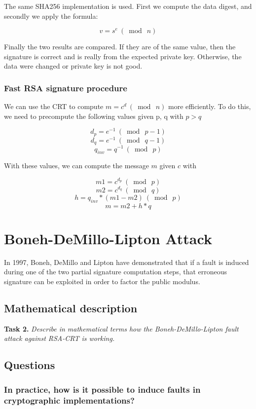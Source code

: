 \documentclass[a4paper]{report}
\begin{document}
The same SHA256 implementation is used. First we compute the data digest, and secondly we apply the formula:

\[
v = s^e  \ (\bmod{\ n} )
\]

Finally the two results are compared. If they are of the same value, then the signature is correct and is really from the expected private key. Otherwise, the data were changed or private key is not good.


\newpage
\subsection{Fast RSA signature procedure}
We can use the CRT to compute $m = c^d\ (\bmod{\ n})$ more efficiently. To do this, we need to precompute the following values given p, q with $p > q$

\[
d_p = e^{-1} \ (\bmod{\ p - 1} )
\]
\[
d_q = e^{-1} \ (\bmod{\ q - 1} )
\]
\[
q_{inv} = q^{-1} \ ( \bmod{\ p} )
\]

With these values, we can compute the message $m$ given $c$ with

\[
m1 = c^{d_p}\ (\bmod\ p)
\]
\[
m2 = c^{d_q}\ (\bmod\ q)
\]
\[
h = q_{inv} * (m1 - m2)\ (\bmod\ p)
\]
\[
m = m2 + h*q 
\]



\chapter{Boneh-DeMillo-Lipton Attack}
In 1997, Boneh, DeMillo and Lipton have demonstrated that if a fault is induced during one of the two partial signature computation steps, that erroneous signature can be exploited in order to factor the public modulus.

\section{Mathematical description}
\textbf{Task 2.} \textit{Describe in mathematical terms how the Boneh-DeMillo-Lipton fault attack against RSA-CRT is working.}

\section{Questions}
\subsection{In practice, how is it possible to induce faults in cryptographic implementations?}
\end{document}
